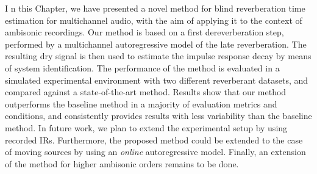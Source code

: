 I n this Chapter, we have presented  a novel method for blind reverberation time estimation for multichannel audio, with the aim of applying it to the context of ambisonic recordings. Our method is based on a first dereverberation step,  performed by a multichannel autoregressive model of the late reverberation. The resulting dry signal is then used to estimate the impulse response decay by means of system identification. 
The performance of the method is evaluated in a simulated experimental environment with two different reverberant datasets, and compared against a state-of-the-art method. 
Results show that our method outperforms the baseline method in a majority of evaluation metrics and conditions, and consistently provides results with less variability than the baseline method. 
In future work, we plan to extend the experimental setup by using recorded IRs. Furthermore, the proposed method could be extended to the case of moving sources by using an \textit{online} autoregressive model. 
Finally, an extension of the method for higher ambisonic orders remains to be done.
